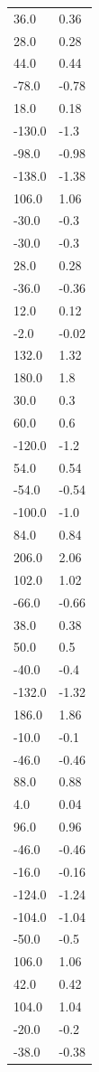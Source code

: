 \begin{longtable}{ll}
36.0 & 0.36 \\
28.0 & 0.28 \\
44.0 & 0.44 \\
-78.0 & -0.78 \\
18.0 & 0.18 \\
-130.0 & -1.3 \\
-98.0 & -0.98 \\
-138.0 & -1.38 \\
106.0 & 1.06 \\
-30.0 & -0.3 \\
-30.0 & -0.3 \\
28.0 & 0.28 \\
-36.0 & -0.36 \\
12.0 & 0.12 \\
-2.0 & -0.02 \\
132.0 & 1.32 \\
180.0 & 1.8 \\
30.0 & 0.3 \\
60.0 & 0.6 \\
-120.0 & -1.2 \\
54.0 & 0.54 \\
-54.0 & -0.54 \\
-100.0 & -1.0 \\
84.0 & 0.84 \\
206.0 & 2.06 \\
102.0 & 1.02 \\
-66.0 & -0.66 \\
38.0 & 0.38 \\
50.0 & 0.5 \\
-40.0 & -0.4 \\
-132.0 & -1.32 \\
186.0 & 1.86 \\
-10.0 & -0.1 \\
-46.0 & -0.46 \\
88.0 & 0.88 \\
4.0 & 0.04 \\
96.0 & 0.96 \\
-46.0 & -0.46 \\
-16.0 & -0.16 \\
-124.0 & -1.24 \\
-104.0 & -1.04 \\
-50.0 & -0.5 \\
106.0 & 1.06 \\
42.0 & 0.42 \\
104.0 & 1.04 \\
-20.0 & -0.2 \\
-38.0 & -0.38 \\

\end{longtable}
